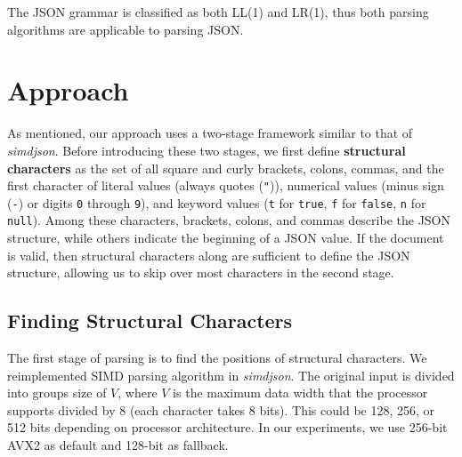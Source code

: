 \documentclass[11pt]{article}
\begin{document}
The JSON grammar is classified as both LL(1) and LR(1), thus both parsing algorithms are applicable to parsing JSON.

\section{Approach}

As mentioned, our approach uses a two-stage framework similar to that of \textit{simdjson}. Before introducing these two stages, we first define \textbf{structural characters} as the set of all square and curly brackets, colons, commas, and the first character of literal values (always quotes (\texttt{"})), numerical values (minus sign (\texttt{-}) or digits \texttt{0} through \texttt{9}), and keyword values (\texttt{t} for \texttt{true}, \texttt{f} for \texttt{false}, \texttt{n} for \texttt{null}). Among these characters, brackets, colons, and commas describe the JSON structure, while others indicate the beginning of a JSON value. If the document is valid, then structural characters along are sufficient to define the JSON structure, allowing us to skip over most characters in the second stage.

\subsection{Finding Structural Characters}

The first stage of parsing is to find the positions of structural characters. We reimplemented SIMD parsing algorithm in \textit{simdjson}. The original input is divided into groups size of $V$, where $V$ is the maximum data width that the processor supports divided by 8 (each character takes 8 bits). This could be 128, 256, or 512 bits depending on processor architecture. In our experiments, we use 256-bit AVX2 as default and 128-bit as fallback.
\end{document}
